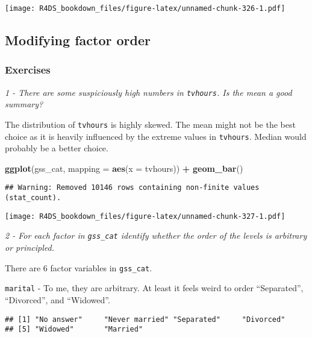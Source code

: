\documentclass[]{article}
\newenvironment{Shaded}{\begin{snugshade}}{\end{snugshade}}
\newcommand{\KeywordTok}[1]{\textcolor[rgb]{0.13,0.29,0.53}{\textbf{#1}}}
\newcommand{\DataTypeTok}[1]{\textcolor[rgb]{0.13,0.29,0.53}{#1}}
\newcommand{\StringTok}[1]{\textcolor[rgb]{0.31,0.60,0.02}{#1}}
\newcommand{\OperatorTok}[1]{\textcolor[rgb]{0.81,0.36,0.00}{\textbf{#1}}}
\newcommand{\NormalTok}[1]{#1}
\theoremstyle{definition}
\theoremstyle{definition}
\theoremstyle{definition}
\theoremstyle{remark}
\begin{document}
\texttt{[image: R4DS\_bookdown\_files/figure-latex/unnamed-chunk-326-1.pdf]}

\subsection{Modifying factor order}\label{modifying-factor-order}

\subsubsection{Exercises}\label{exercises-38}

\emph{1 - There are some suspiciously high numbers in \texttt{tvhours}.
Is the mean a good summary?}

The distribution of \texttt{tvhours} is highly skewed. The mean might
not be the best choice as it is heavily influenced by the extreme values
in \texttt{tvhours}. Median would probably be a better choice.

\begin{Shaded}
\begin{Highlighting}[]
\KeywordTok{ggplot}\NormalTok{(gss_cat, }\DataTypeTok{mapping =} \KeywordTok{aes}\NormalTok{(}\DataTypeTok{x =}\NormalTok{ tvhours)) }\OperatorTok{+}
\StringTok{  }\KeywordTok{geom_bar}\NormalTok{()}
\end{Highlighting}
\end{Shaded}

\begin{verbatim}
## Warning: Removed 10146 rows containing non-finite values (stat_count).
\end{verbatim}

\texttt{[image: R4DS\_bookdown\_files/figure-latex/unnamed-chunk-327-1.pdf]}

\emph{2 - For each factor in \texttt{gss\_cat} identify whether the
order of the levels is arbitrary or principled.}

There are 6 factor variables in \texttt{gss\_cat}.

\texttt{marital} - To me, they are arbitrary. At least it feels weird to
order ``Separated'', ``Divorced'', and ``Widowed''.

\begin{Shaded}
\end{Shaded}

\begin{verbatim}
## [1] "No answer"     "Never married" "Separated"     "Divorced"     
## [5] "Widowed"       "Married"
\end{verbatim}
\end{document}
